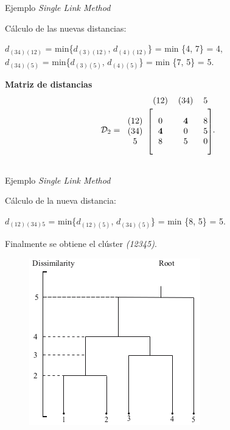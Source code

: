 \documentclass[spanish]{beamer}
\begin{document}
\begin{frame}{Ejemplo \textit{Single Link Method}}

	Cálculo de las nuevas distancias:\\
	\begin{center}
		$d_{(34)(12)}$ = min\{$d_{(3)(12)}$, $d_{(4)(12)}$\} = min \{4, 7\} = 4,\\
		$d_{(34)(5)}$ = min\{$d_{(3)(5)}$, $d_{(4)(5)}$\} = min \{7, 5\} = 5.\\
	\end{center}
	\textbf{Matriz de distancias}
	\[ \mathcal{D}_2  =
	\begin{blockarray}{cccc}
		& (12) & (34) & 5 \\
		\begin{block}{c[ccc]}
			\\
			(12) & 0 & \textbf{4} & 8 \\
			(34) & \textbf{4} & 0 & 5 \\
			5 & 8 & 5 & 0 \\
			\\
		\end{block}
	\end{blockarray}  .
	\] 
\end{frame}

\begin{frame}{Ejemplo \textit{Single Link Method}}

	Cálculo de la nueva distancia:
	\begin{center}
	$d_{(12)(34)5}$ = min\{$d_{(12)(5)}$, $d_{(34)(5)}$\} = min \{8, 5\} = 5.
	\end{center}
	Finalmente se obtiene el clúster \textit{(12345)}.

	\begin{figure}[H]
		\centering
		\includegraphics[scale=0.48]{victoria/agloEjem}
		\label{fig:agloEjem}
	\end{figure}
\end{frame}
\end{document}
